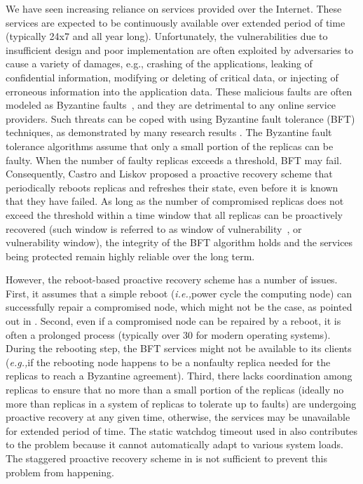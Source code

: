 \documentclass[times, 10pt, twocolumn]{article}
\newcommand{\ie}{{\it i.e.,}}
\newcommand{\eg}{{\it e.g.,}}
\begin{document}
We have seen increasing reliance on services provided over the Internet. 
These services are expected to be continuously available over extended 
period of time (typically 24x7 and all year long). Unfortunately,
the vulnerabilities due to insufficient design and poor implementation 
are often exploited by adversaries to cause a variety of damages, e.g., 
crashing of the applications, leaking of confidential information, 
modifying or deleting of critical data, or injecting of erroneous 
information into the application data. These malicious faults are often 
modeled as Byzantine faults~\cite{lamport:byz}, 
and they are detrimental to any online
service providers. Such threats can be coped with using Byzantine
fault tolerance (BFT) techniques, as demonstrated by many research results
\cite{bft-osdi99, bft-osdi2000, bft-acm, base,hq,thema,oceanstore,alvisi-bft}. 
The Byzantine fault tolerance algorithms assume that only
a small portion of the replicas can be faulty. When the number of faulty
replicas exceeds a threshold, BFT may fail. Consequently, Castro and
Liskov \cite{bft-osdi2000} proposed a proactive recovery scheme that
periodically reboots replicas and refreshes their state, even before
it is known that they have failed. As long as the number of compromised
replicas does not exceed the threshold within a time window that all replicas
can be proactively recovered (such window is referred to as window of 
vulnerability~\cite{bft-acm}, or vulnerability window), 
the integrity of the BFT algorithm holds and the services being protected 
remain highly reliable over the long term.

However, the reboot-based proactive recovery scheme has a number of
issues. First, it assumes that a simple reboot (\ie power cycle the computing
node) can successfully repair a compromised node, which might not be the case, 
as pointed out in \cite{bftlls}. Second, even if a compromised
node can be repaired by a reboot, it is often a prolonged
process (typically over 30 for modern operating systems). During 
the rebooting step, the BFT services might not be available
to its clients (\eg if the rebooting node happens to be a nonfaulty replica
needed for the replicas to reach a Byzantine agreement). Third, there lacks 
coordination among replicas to ensure that no more than a small portion of the 
replicas (ideally no more than  replicas in a system of  replicas to 
tolerate up to  faults) are undergoing proactive recovery at any 
given time, otherwise, the services may be unavailable for extended 
period of time. The static watchdog 
timeout used in \cite{bft-acm} also contributes to the problem because it
cannot automatically adapt to various system loads. The staggered 
proactive recovery scheme in \cite{bft-acm} is not sufficient to prevent
this problem from happening.
\end{document}
